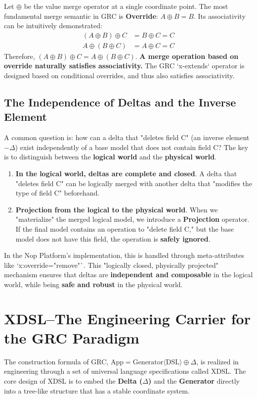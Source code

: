 \documentclass[11pt]{article}
\begin{document}
Let $\oplus$ be the value merge operator at a single coordinate point. The most fundamental merge semantic in GRC is \textbf{Override}: $A \oplus B = B$.
Its associativity can be intuitively demonstrated:
\begin{align*}
(A \oplus B) \oplus C &= B \oplus C = C \\
A \oplus (B \oplus C) &= A \oplus C = C
\end{align*}
Therefore, $(A \oplus B) \oplus C = A \oplus (B \oplus C)$. \textbf{A merge operation based on override naturally satisfies associativity.} The GRC `x-extends` operator is designed based on conditional overrides, and thus also satisfies associativity.

\subsection{The Independence of Deltas and the Inverse Element}
A common question is: how can a delta that "deletes field C" (an inverse element $-\Delta$) exist independently of a base model that does not contain field C? The key is to distinguish between the \textbf{logical world} and the \textbf{physical world}.
\begin{enumerate}
    \item \textbf{In the logical world, deltas are complete and closed}. A delta that "deletes field C" can be logically merged with another delta that "modifies the type of field C" beforehand.
    \item \textbf{Projection from the logical to the physical world}. When we "materialize" the merged logical model, we introduce a \textbf{Projection} operator. If the final model contains an operation to "delete field C," but the base model does not have this field, the operation is \textbf{safely ignored}.
\end{enumerate}
In the Nop Platform's implementation, this is handled through meta-attributes like `x:override="remove"`. This "logically closed, physically projected" mechanism ensures that deltas are \textbf{independent and composable} in the logical world, while being \textbf{safe and robust} in the physical world.

\section{XDSL--The Engineering Carrier for the GRC Paradigm}

The construction formula of GRC, $\text{App} = \text{Generator}\langle\text{DSL}\rangle \oplus \Delta$, is realized in engineering through a set of universal language specifications called XDSL. The core design of XDSL is to embed the \textbf{Delta ($\Delta$)} and the \textbf{Generator} directly into a tree-like structure that has a stable coordinate system.
\end{document}
